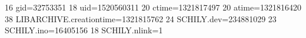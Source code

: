 16 gid=32753351
18 uid=1520560311
20 ctime=1321817497
20 atime=1321816420
38 LIBARCHIVE.creationtime=1321815762
24 SCHILY.dev=234881029
23 SCHILY.ino=16405156
18 SCHILY.nlink=1
